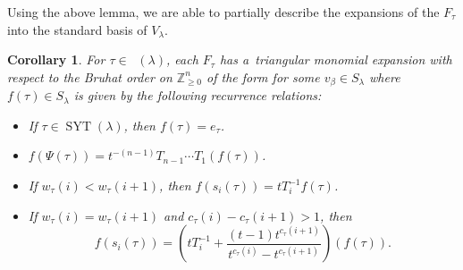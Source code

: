 \documentclass[pdftex]{sigma}
\numberwithin{equation}{section}
\newtheorem{Corollary}[Theorem]{Corollary}
\theoremstyle{definition}
\DeclareMathOperator{\SYT}{\mathrm{SYT}}
\DeclareMathOperator{\PSYT}{\mathrm{PSYT}_{\geq 0}}
\begin{document}
Using the above lemma, we are able to partially describe the expansions of the $F_{\tau}$ into the standard basis of $V_{\lambda}$.

\begin{Corollary}\label{triangular expansion}
For $\tau \in \PSYT(\lambda)$, each $F_{\tau}$ has a~triangular monomial expansion with respect to the Bruhat order on $\mathbb{Z}^n_{\geq 0}$ of the form
 for some $v_{\beta} \in S_\lambda$ where $f(\tau) \in S_\lambda$ is given by the following recurrence relations:

\begin{itemize}
\itemsep=0pt
 \item If $\tau \in \SYT(\lambda)$, then $f(\tau) = e_{\tau}$.
 \item $f(\Psi(\tau)) = t^{-(n-1)}T_{n-1}\cdots T_1(f(\tau))$.
 \item If $w_{\tau}(i) < w_{\tau}(i+1)$, then $f(s_i(\tau)) = tT_i^{-1}f(\tau)$.
 \item If $w_{\tau}(i) = w_{\tau}(i+1)$ and $c_{\tau}(i)-c_{\tau}(i+1) > 1$, then
 \[
 f(s_i(\tau)) = \left( tT_i^{-1} + \frac{(t-1)t^{c_{\tau}(i+1)}}{t^{c_{\tau}(i)} - t^{c_{\tau}(i+1)}} \right)(f(\tau)).
 \]

\end{itemize}

\end{Corollary}
\end{document}
